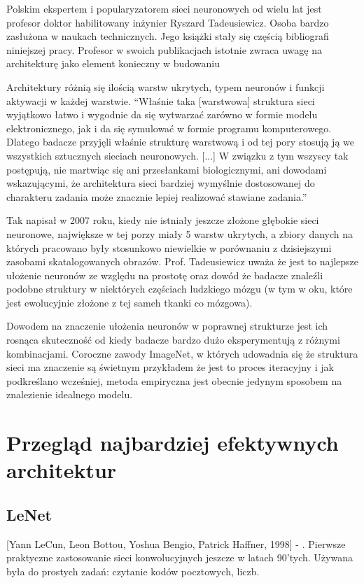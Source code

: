 \documentclass[12pt,a4paper,twoside,titlepage,openright]{book}
\begin{document}
Polskim ekspertem i popularyzatorem sieci neuronowych od wielu lat jest profesor doktor habilitowany inżynier Ryszard Tadeusiewicz. Osoba bardzo zasłużona w naukach technicznych. Jego książki stały się częścią bibliografi niniejszej pracy. Profesor w swoich publikacjach istotnie zwraca uwagę na architekturę jako element konieczny w budowaniu 

Architektury różnią się ilością warstw ukrytych, typem neuronów i funkcji aktywacji w każdej warstwie. 
“Właśnie taka [warstwowa] struktura sieci wyjątkowo łatwo i wygodnie da się wytwarzać zarówno w formie modelu elektronicznego, jak i da się symulować w formie programu komputerowego. Dlatego badacze przyjęli właśnie strukturę warstwową i od tej pory stosują ją we wszystkich sztucznych sieciach neuronowych. [...] W związku z tym wszyscy tak postępują, nie martwiąc się ani przesłankami biologicznymi, ani dowodami wskazującymi, że architektura sieci bardziej wymyślnie dostosowanej do charakteru zadania może znacznie lepiej realizować stawiane zadania.”

Tak napisał w 2007 roku, kiedy nie istniały jeszcze złożone głębokie sieci neuronowe, największe w tej porzy miały 5 warstw ukrytych, a zbiory danych na których pracowano były stosunkowo niewielkie w porównaniu z dzisiejszymi zasobami skatalogowanych obrazów. Prof. Tadeusiewicz uważa że jest to najlepsze ułożenie neuronów ze względu na prostotę oraz dowód że badacze znaleźli podobne struktury w niektórych częściach ludzkiego mózgu (w tym w oku, które jest ewolucyjnie złożone z tej sameh tkanki co mózgowa).

Dowodem na znaczenie ułożenia neuronów w poprawnej strukturze jest ich rosnąca skuteczność od kiedy badacze bardzo dużo eksperymentują z różnymi kombinacjami. Coroczne zawody ImageNet, w których udowadnia się że struktura sieci ma znaczenie są świetnym przykładem że jest to proces iteracyjny i jak podkreślano wcześniej, metoda empiryczna jest obecnie jedynym sposobem na znalezienie idealnego modelu.

\section{Przegląd najbardziej efektywnych architektur}

\subsection{LeNet}
[Yann LeCun, Leon Bottou, Yoshua Bengio, Patrick Haffner, 1998] - . Pierwsze praktyczne zastosowanie sieci konwolucyjnych jeszcze w latach 90’tych. Używana była do prostych zadań: czytanie kodów pocztowych, liczb.\cite{Lecun98gradient-basedlearning}
\end{document}
